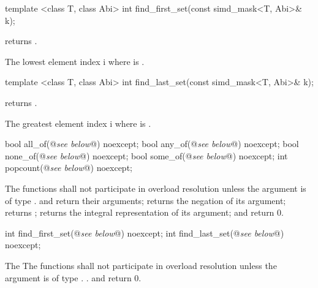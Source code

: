 \begin{itemdecl}
template <class T, class Abi> int find_first_set(const simd_mask<T, Abi>& k);
\end{itemdecl}
\begin{itemdescr}
  \pnum\requires {} returns \true.

  \pnum\returns The lowest element index \code i where  is \true.
\end{itemdescr}

\begin{itemdecl}
template <class T, class Abi> int find_last_set(const simd_mask<T, Abi>& k);
\end{itemdecl}
\begin{itemdescr}
  \pnum\requires {} returns \true.

  \pnum\returns The greatest element index \code i where  is \true.
\end{itemdescr}

\begin{itemdecl}
bool  all_of(@\emph{see below}@) noexcept;
bool  any_of(@\emph{see below}@) noexcept;
bool none_of(@\emph{see below}@) noexcept;
bool some_of(@\emph{see below}@) noexcept;
int popcount(@\emph{see below}@) noexcept;
\end{itemdecl}
\begin{itemdescr}
  \pnum\remarks The functions shall not participate in overload resolution unless the argument is of type \bool.
  \pnum\returns {} and  return their arguments;  returns the negation of its argument;  returns \false;  returns the integral representation of its argument;  and  return 0.
\end{itemdescr}

\begin{itemdecl}
int find_first_set(@\emph{see below}@) noexcept;
int find_last_set(@\emph{see below}@) noexcept;
\end{itemdecl}
\begin{itemdescr}
  \pnum\requires The
  \pnum\remarks The functions shall not participate in overload resolution unless the argument is of type \bool.
  \pnum\returns {}.
   and  return 0.
\end{itemdescr}

